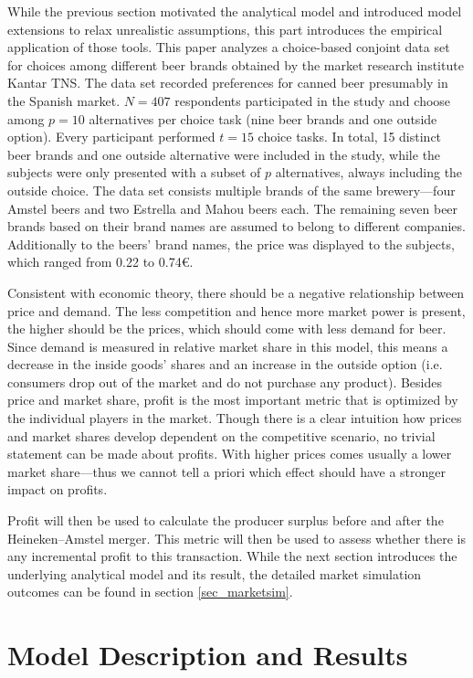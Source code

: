 \documentclass[12pt,a4paper]{article}
\begin{document}
While the previous section motivated the analytical model and introduced model extensions to relax unrealistic assumptions,
this part introduces the empirical application of those tools.
This paper analyzes a choice-based conjoint data set for choices among different beer brands obtained by the market research institute Kantar TNS.
The data set recorded preferences for canned beer presumably in the Spanish market.
 $N=407$ respondents participated in the study and choose among $p=10$ alternatives per choice task (nine beer brands and one outside option).
Every participant performed $t=15$ choice tasks. In total, 15 distinct beer brands and one outside alternative were included in the study,
while the subjects were only presented with a subset of $p$ alternatives, always including the outside choice.
The data set consists multiple brands of the same brewery---four Amstel beers and two Estrella and Mahou beers each.
The remaining seven beer brands based on their brand names are assumed to belong to different companies.
Additionally to the beers' brand names, the price was displayed to the subjects, which ranged from 0.22 to 0.74\euro.

Consistent with economic theory, there should be a negative relationship between price and demand.
The less competition and hence more market power is present, the higher should be the prices, which should come with less demand for beer.
Since demand is measured in relative market share in this model, this means a decrease in the inside goods' shares and an increase in the outside option (i.e. consumers drop out of the market and do not purchase any product).
Besides price and market share, profit is the most important metric that is optimized by the individual players in the market.
Though there is a clear intuition how prices and market shares develop dependent on the competitive scenario, no trivial statement can be made about profits.
With higher prices comes usually a lower market share---thus we cannot tell a priori which effect should have a stronger impact on profits.

Profit will then be used to calculate the producer surplus before and after the Heineken--Amstel merger.
This metric will then be used to assess whether there is any incremental profit to this transaction.
While the next section introduces the underlying analytical model and its result, the detailed market simulation outcomes can be found in section \ref{sec_marketsim}.


\section{Model Description and Results}
\end{document}
